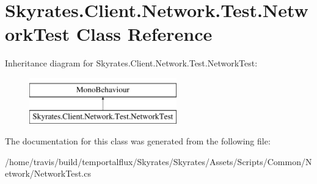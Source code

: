 \hypertarget{class_skyrates_1_1_client_1_1_network_1_1_test_1_1_network_test}{\section{Skyrates.\-Client.\-Network.\-Test.\-Network\-Test Class Reference}
\label{class_skyrates_1_1_client_1_1_network_1_1_test_1_1_network_test}
}
Inheritance diagram for Skyrates.\-Client.\-Network.\-Test.\-Network\-Test\-:\begin{figure}[H]
\begin{center}
\leavevmode
\includegraphics[height=2.000000cm]{class_skyrates_1_1_client_1_1_network_1_1_test_1_1_network_test}
\end{center}
\end{figure}


The documentation for this class was generated from the following file\-:\begin{DoxyCompactItemize}
\item 
/home/travis/build/temportalflux/\-Skyrates/\-Skyrates/\-Assets/\-Scripts/\-Common/\-Network/Network\-Test.\-cs\end{DoxyCompactItemize}
